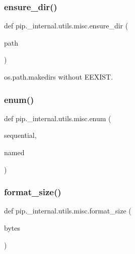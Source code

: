 \subsubsection{\texorpdfstring{ensure\+\_\+dir()}{ensure\_dir()}}
{\footnotesize\ttfamily def pip.\+\_\+internal.\+utils.\+misc.\+ensure\+\_\+dir (\begin{DoxyParamCaption}\item[{}]{path }\end{DoxyParamCaption})}

\begin{DoxyVerb}os.path.makedirs without EEXIST.\end{DoxyVerb}
 \mbox{\label{namespacepip_1_1__internal_1_1utils_1_1misc_aa23cdf3c7f78cefe2c18a9946c151f1b}} 
\subsubsection{\texorpdfstring{enum()}{enum()}}
{\footnotesize\ttfamily def pip.\+\_\+internal.\+utils.\+misc.\+enum (\begin{DoxyParamCaption}\item[{}]{sequential,  }\item[{}]{named }\end{DoxyParamCaption})}

\mbox{\label{namespacepip_1_1__internal_1_1utils_1_1misc_a5539276cb0470f38614f3ca2c19be2e0}} 
\subsubsection{\texorpdfstring{format\+\_\+size()}{format\_size()}}
{\footnotesize\ttfamily def pip.\+\_\+internal.\+utils.\+misc.\+format\+\_\+size (\begin{DoxyParamCaption}\item[{}]{bytes }\end{DoxyParamCaption})}

